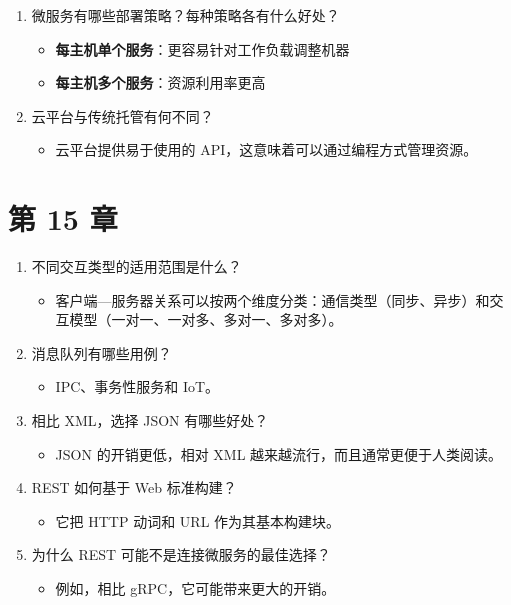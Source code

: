 \begin{enumerate}
\begin{itemize}
\item 要由各自的团队手动处理大量微服务的测试与部署，几乎是不可能的。
\end{itemize}
\item 微服务有哪些部署策略？每种策略各有什么好处？

\begin{itemize}
\item \textbf{每主机单个服务}：更容易针对工作负载调整机器
\item \textbf{每主机多个服务}：资源利用率更高
\end{itemize}
\item 云平台与传统托管有何不同？

\begin{itemize}
\item 云平台提供易于使用的 API，这意味着可以通过编程方式管理资源。
\end{itemize}
\end{enumerate}

\section*{第 15 章}

\begin{enumerate}
\item 不同交互类型的适用范围是什么？

\begin{itemize}
\item 客户端—服务器关系可以按两个维度分类：通信类型（同步、异步）和交互模型（一对一、一对多、多对一、多对多）。
\end{itemize}
\item 消息队列有哪些用例？

\begin{itemize}
\item IPC、事务性服务和 IoT。
\end{itemize}
\item 相比 XML，选择 JSON 有哪些好处？

\begin{itemize}
\item JSON 的开销更低，相对 XML 越来越流行，而且通常更便于人类阅读。
\end{itemize}
\item REST 如何基于 Web 标准构建？

\begin{itemize}
\item 它把 HTTP 动词和 URL 作为其基本构建块。
\end{itemize}
\item 为什么 REST 可能不是连接微服务的最佳选择？

\begin{itemize}
\item 例如，相比 gRPC，它可能带来更大的开销。
\end{itemize}
\end{enumerate}

